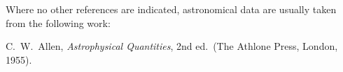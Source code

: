 %


Where no other references are indicated, astronomical data are usually
taken from the following work:
\par\smallskip
\noindent C.~W.~Allen, \emph{Astrophysical Quantities}, 2nd ed.\
(The Athlone Press, London, 1955).

